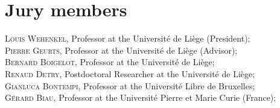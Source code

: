 
\chapter*{Jury members}


\noindent \textsc{Louis Wehenkel}, Professor at the Universit{\'e} de Li{\`e}ge (President); \\

\noindent \textsc{Pierre Geurts}, Professor at the Universit{\'e} de Li{\`e}ge (Advisor); \\

\noindent \textsc{Bernard Boigelot}, Professor at the Universit{\'e} de Li{\`e}ge; \\

\noindent \textsc{Renaud Detry}, Postdoctoral Researcher at the Universit{\'e} de Li{\`e}ge; \\

\noindent \textsc{Gianluca Bontempi}, Professor at the Universit{\'e} Libre de Bruxelles; \\

\noindent \textsc{G{\'e}rard Biau}, Professor at the Universit{\'e} Pierre et Marie Curie (France); \\

